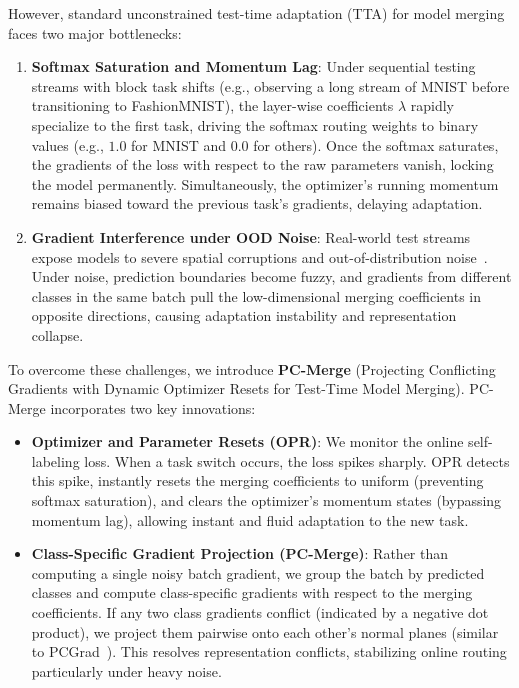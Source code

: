 \documentclass{article}
\theoremstyle{plain}
\theoremstyle{definition}
\theoremstyle{remark}
\begin{document}
However, standard unconstrained test-time adaptation (TTA) for model merging faces two major bottlenecks:
\begin{enumerate}
    \item \textbf{Softmax Saturation and Momentum Lag}: Under sequential testing streams with block task shifts (e.g., observing a long stream of MNIST before transitioning to FashionMNIST), the layer-wise coefficients $\lambda$ rapidly specialize to the first task, driving the softmax routing weights to binary values (e.g., $1.0$ for MNIST and $0.0$ for others). Once the softmax saturates, the gradients of the loss with respect to the raw parameters vanish, locking the model permanently. Simultaneously, the optimizer's running momentum remains biased toward the previous task's gradients, delaying adaptation.
    \item \textbf{Gradient Interference under OOD Noise}: Real-world test streams expose models to severe spatial corruptions and out-of-distribution noise~\cite{hendrycks2019benchmarking, geirhos2018imagenet}. Under noise, prediction boundaries become fuzzy, and gradients from different classes in the same batch pull the low-dimensional merging coefficients in opposite directions, causing adaptation instability and representation collapse.
\end{enumerate}

To overcome these challenges, we introduce \textbf{PC-Merge} (Projecting Conflicting Gradients with Dynamic Optimizer Resets for Test-Time Model Merging). PC-Merge incorporates two key innovations:
\begin{itemize}
    \item \textbf{Optimizer and Parameter Resets (OPR)}: We monitor the online self-labeling loss. When a task switch occurs, the loss spikes sharply. OPR detects this spike, instantly resets the merging coefficients to uniform (preventing softmax saturation), and clears the optimizer's momentum states (bypassing momentum lag), allowing instant and fluid adaptation to the new task.
    \item \textbf{Class-Specific Gradient Projection (PC-Merge)}: Rather than computing a single noisy batch gradient, we group the batch by predicted classes and compute class-specific gradients with respect to the merging coefficients. If any two class gradients conflict (indicated by a negative dot product), we project them pairwise onto each other's normal planes (similar to PCGrad~\cite{yu2020gradient}). This resolves representation conflicts, stabilizing online routing particularly under heavy noise.
\end{itemize}
\end{document}
